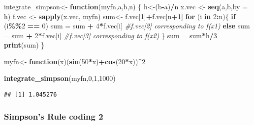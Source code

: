 \documentclass[
]{article}
\newenvironment{Shaded}{\begin{snugshade}}{\end{snugshade}}
\newcommand{\AttributeTok}[1]{\textcolor[rgb]{0.13,0.29,0.53}{#1}}
\newcommand{\CommentTok}[1]{\textcolor[rgb]{0.56,0.35,0.01}{\textit{#1}}}
\newcommand{\ControlFlowTok}[1]{\textcolor[rgb]{0.13,0.29,0.53}{\textbf{#1}}}
\newcommand{\DecValTok}[1]{\textcolor[rgb]{0.00,0.00,0.81}{#1}}
\newcommand{\FunctionTok}[1]{\textcolor[rgb]{0.13,0.29,0.53}{\textbf{#1}}}
\newcommand{\NormalTok}[1]{#1}
\newcommand{\OtherTok}[1]{\textcolor[rgb]{0.56,0.35,0.01}{#1}}
\newcommand{\SpecialCharTok}[1]{\textcolor[rgb]{0.81,0.36,0.00}{\textbf{#1}}}
\begin{document}
\begin{Shaded}
\begin{Highlighting}[]
\NormalTok{integrate\_simpson}\OtherTok{\textless{}{-}} \ControlFlowTok{function}\NormalTok{(myfn,a,b,n) \{}
\NormalTok{  h}\OtherTok{\textless{}{-}}\NormalTok{(b}\SpecialCharTok{{-}}\NormalTok{a)}\SpecialCharTok{/}\NormalTok{n}
\NormalTok{  x.vec }\OtherTok{\textless{}{-}} \FunctionTok{seq}\NormalTok{(a,b,}\AttributeTok{by =}\NormalTok{ h)}
\NormalTok{  f.vec }\OtherTok{\textless{}{-}} \FunctionTok{sapply}\NormalTok{(x.vec, myfn) }
\NormalTok{  sum}\OtherTok{\textless{}{-}}\NormalTok{ f.vec[}\DecValTok{1}\NormalTok{]}\SpecialCharTok{+}\NormalTok{f.vec[n}\SpecialCharTok{+}\DecValTok{1}\NormalTok{]}
  \ControlFlowTok{for}\NormalTok{ (i }\ControlFlowTok{in} \DecValTok{2}\SpecialCharTok{:}\NormalTok{n)\{}
    \ControlFlowTok{if}\NormalTok{ (i}\SpecialCharTok{\%\%}\DecValTok{2} \SpecialCharTok{==} \DecValTok{0}\NormalTok{)}
\NormalTok{      sum }\OtherTok{=}\NormalTok{ sum }\SpecialCharTok{+} \DecValTok{4}\SpecialCharTok{*}\NormalTok{f.vec[i] }\CommentTok{\#f.vec[2] corresponding to f(x1)}
    \ControlFlowTok{else} 
\NormalTok{      sum }\OtherTok{=}\NormalTok{ sum }\SpecialCharTok{+} \DecValTok{2}\SpecialCharTok{*}\NormalTok{f.vec[i] }\CommentTok{\#f.vec[3] corresponding to f(x2)}
\NormalTok{  \}}
\NormalTok{  sum }\OtherTok{=}\NormalTok{ sum}\SpecialCharTok{*}\NormalTok{h}\SpecialCharTok{/}\DecValTok{3}
  \FunctionTok{print}\NormalTok{(sum)}
\NormalTok{\}}

\NormalTok{myfn}\OtherTok{\textless{}{-}} \ControlFlowTok{function}\NormalTok{(x)(}\FunctionTok{sin}\NormalTok{(}\DecValTok{50}\SpecialCharTok{*}\NormalTok{x)}\SpecialCharTok{+}\FunctionTok{cos}\NormalTok{(}\DecValTok{20}\SpecialCharTok{*}\NormalTok{x))}\SpecialCharTok{\^{}}\DecValTok{2}

\FunctionTok{integrate\_simpson}\NormalTok{(myfn,}\DecValTok{0}\NormalTok{,}\DecValTok{1}\NormalTok{,}\DecValTok{1000}\NormalTok{)}
\end{Highlighting}
\end{Shaded}

\begin{verbatim}
## [1] 1.045276
\end{verbatim}

\hypertarget{simpsons-rule-coding-2}{%
\subsubsection{Simpson's Rule coding 2}\label{simpsons-rule-coding-2}}
\end{document}
